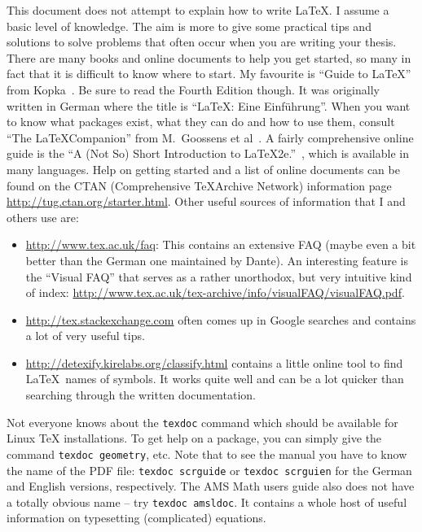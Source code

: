 This document does not attempt to explain how to write \LaTeX. I
assume a basic level of knowledge. The aim is more to give some
practical tips and solutions to solve problems that often occur when
you are writing your thesis. There are many books and online documents
to help you get started, so many in fact that it is difficult to know
where to start. My favourite is \enquote{Guide to \LaTeX} from
Kopka~\cite{kopka04}. Be sure to read the Fourth Edition though. It
was originally written in German where the title is
\foreignquote{ngerman}{\LaTeX: Eine Einführung}. When you want to know
what packages exist, what they can do and how to use them, consult
\enquote{The \LaTeX Companion} from M.~Goossens et
al~\cite{goossens04}. A fairly comprehensive online guide is the
\enquote{A (Not So) Short Introduction to LaTeX2e.}~\cite{lshort},
which is available in many languages.
Help on getting started and a list of online
documents can be found on the CTAN (Comprehensive \TeX Archive
Network) information page
\url{http://tug.ctan.org/starter.html}. Other useful sources of
information that I and others use are:
\begin{itemize}
\item \url{http://www.tex.ac.uk/faq}:
  This contains an extensive FAQ (maybe even a bit better than the German 
  one maintained by Dante). An interesting feature is the \enquote{Visual FAQ}
  that serves as a rather unorthodox, but very intuitive kind of index:
  \url{http://www.tex.ac.uk/tex-archive/info/visualFAQ/visualFAQ.pdf}.
\item \url{http://tex.stackexchange.com} often comes up in Google
  searches and contains a lot of very useful tips.
\item \url{http://detexify.kirelabs.org/classify.html} contains a
  little online tool to find \LaTeX\ names of symbols. It works quite
  well and can be a lot quicker than searching through the written
  documentation.
\end{itemize}

Not everyone knows about the \texttt{texdoc} command
which should be available for Linux \TeX{} installations. To get help
on a package, you can simply give the command \texttt{texdoc
  geometry}, etc. Note that to see the \KOMAScript{} manual you have
to know the name of the PDF file: \texttt{texdoc scrguide} or
\texttt{texdoc scrguien} for the German and English versions,
respectively. The AMS Math users guide also does not have a totally
obvious name -- try \texttt{texdoc amsldoc}. It
contains a whole host of useful information on typesetting
(complicated) equations.

